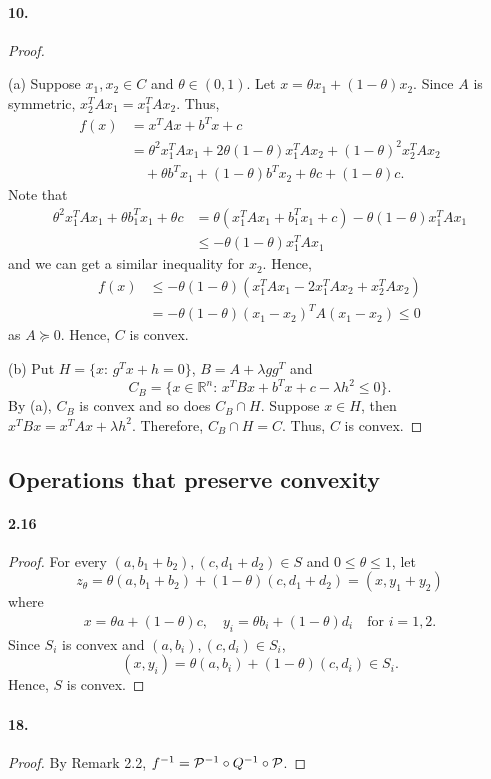   \paragraph{10.}
  \begin{proof}
    $\,$\par
    (a) Suppose $x_1,x_2\in C$ and $\theta\in(0,1)$. Let $x=\theta x_1+(1-
    \theta)x_2$. Since $A$ is symmetric, $x_2^TAx_1 = x_1^TAx_2$. Thus,
    \begin{align*}
      f(x)
      &= x^TAx+b^Tx+c \\
      &=\theta^2 x_1^TAx_1+2\theta(1-\theta)x_1^TAx_2 + (1-\theta)^2x_2^TAx_2\\
      &\quad+\theta b^Tx_1 + (1-\theta)b^Tx_2 + \theta c + (1-\theta)c.
    \end{align*}
    Note that
    \begin{align*}
      \theta^2x_1^TAx_1+\theta b_1^Tx_1 + \theta c 
      &= \theta(x_1^TAx_1 + b_1^Tx_1+c) - \theta(1-\theta)x_1^TAx_1\\
      &\le -\theta(1-\theta)x_1^TAx_1
    \end{align*}
    and we can get a similar inequality for $x_2$. Hence,
    \begin{align*}
      f(x) &\le -\theta(1-\theta)(x_1^TAx_1 - 2x_1^TAx_2 + x_2^TAx_2) \\
      &= -\theta(1-\theta)(x_1-x_2)^TA(x_1-x_2) \le 0
    \end{align*}
    as $A\succeq 0$. Hence, $C$ is convex.\par
    (b) Put $H=\{x:\, g^Tx+h=0\}$, $B=A+\lambda gg^T$ and 
    \[
      C_B=\{x\in \mathbb{R}^n:\, x^TBx+b^Tx+c-\lambda h^2\le 0\}.
    \]
    By (a), $C_B$ is convex and so does $C_B\cap H$. Suppose $x\in H$, then 
    $x^TBx=x^TAx +\lambda h^2$. Therefore, $C_B\cap H=C$. Thus, $C$ is convex.
    
  \end{proof}

\subsection{Operations that preserve convexity}
  \paragraph{2.16}
  \begin{proof}
    For every $(a,b_1+b_2),(c,d_1+d_2)\in S$ and $0\le\theta\le 1$, let 
    \[
      z_\theta = \theta(a,b_1+b_2)+(1-\theta)(c,d_1+d_2) = (x,y_1+y_2)
    \]
    where
    \begin{align*}
      x = \theta a+(1-\theta) c,\quad
      y_i = \theta b_i+(1-\theta)d_i\quad\text{for $i=1,2$}.
    \end{align*}
    Since $S_i$ is convex and $(a,b_i),(c,d_i)\in S_i$,
    \[
      (x,y_i)=\theta(a,b_i) + (1-\theta)(c,d_i)\in S_i.
    \]
    Hence, $S$ is convex.
  \end{proof}

  \paragraph{18.}
  \begin{proof}
    By Remark 2.2, $f^{-1} = \mathcal{P}^{-1}\circ Q^{-1}\circ\mathcal{P}$.
  \end{proof}


